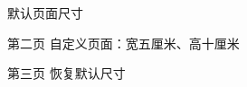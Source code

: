 \documentclass{ltc-guji}
\begin{document}
\begin{guji-content}
默认页面尺寸
\end{guji-content}

\begin{page}[paper-width=5cm, paper-height=10cm, page-split-enabled=false]
第二页
自定义页面：宽五厘米、高十厘米
\end{page}

\begin{guji-content}
第三页
恢复默认尺寸
\end{guji-content}
\end{document}
